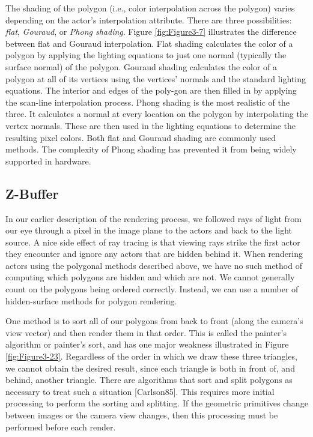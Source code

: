 The shading of the polygon (i.e., color interpolation across the polygon) varies depending on the actor's interpolation attribute. There are three possibilities: \emph{flat}, \emph{Gouraud}, or \emph{Phong shading}. Figure \ref{fig:Figure3-7} illustrates the difference between flat and Gouraud interpolation. Flat shading calculates the color of a polygon by applying the lighting equations to just one normal (typically the surface normal) of the polygon. Gouraud shading calculates the color of a polygon at all of its vertices using the vertices' normals and the standard lighting equations. The interior and edges of the poly-gon are then filled in by applying the scan-line interpolation process. Phong shading is the most realistic of the three. It calculates a normal at every location on the polygon by interpolating the vertex normals. These are then used in the lighting equations to determine the resulting pixel colors. Both flat and Gouraud shading are commonly used methods. The complexity of Phong shading has prevented it from being widely supported in hardware.

\subsection{Z-Buffer}
\label{Z-Buffer}
In our earlier description of the rendering process, we followed rays of light from our eye through a pixel in the image plane to the actors and back to the light source. A nice side effect of ray tracing is that viewing rays strike the first actor they encounter and ignore any actors that are hidden behind it. When rendering actors using the polygonal methods described above, we have no such method of computing which polygons are hidden and which are not. We cannot generally count on the polygons being ordered correctly. Instead, we can use a number of hidden-surface methods for polygon rendering.

One method is to sort all of our polygons from back to front (along the camera’s view vector) and then render them in that order. This is called the painter’s algorithm or painter’s sort, and has one major weakness illustrated in Figure \ref{fig:Figure3-23}. Regardless of the order in which we draw these three triangles, we cannot obtain the desired result, since each triangle is both in front of, and behind, another triangle. There are algorithms that sort and split polygons as necessary to treat such a situation [Carlson85]. This requires more initial processing to perform the sorting and splitting. If the geometric primitives change between images or the camera view changes, then this processing must be performed before each render.

